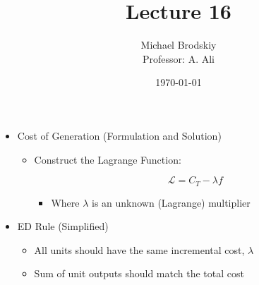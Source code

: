 


\title{Lecture 16}
\date{\today}
\author{Michael Brodskiy\\ \small Professor: A. Ali}



\maketitle

\begin{itemize}

  \item Cost of Generation (Formulation and Solution)

    \begin{itemize}

      \item Construct the Lagrange Function:

        $$\mathcal{L}=C_T-\lambda f$$

        \begin{itemize}

          \item Where $\lambda$ is an unknown (Lagrange) multiplier

        \end{itemize}

    \end{itemize}

  \item ED Rule (Simplified)

    \begin{itemize}

      \item All units should have the same incremental cost, $\lambda$

      \item Sum of unit outputs should match the total cost

    \end{itemize}

\end{itemize}



